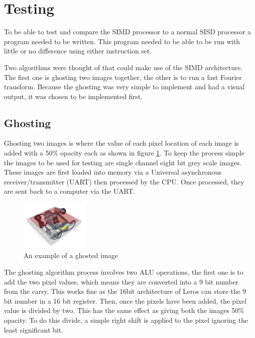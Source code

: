 \section{Testing}

To be able to test and compare the SIMD processor to a normal SISD processor a program
needed to be written. This program needed to be able to be run with little or no
difference using either instruction set.

Two algorithms were thought of that could make use of the SIMD architecture.
The first one is ghosting two images together, the other is to run a fast
Fourier transform. Because the ghosting was very simple to implement and had a
visual output, it was chosen to be implemented first.

\subsection{Ghosting}
  Ghosting two images is where the value of each pixel location of each image is
  added with a 50\% opacity each as shown in figure \ref{ghosting}. To keep the
  process simple the images to be used for testing are single channel eight bit
  grey scale images. These images are first loaded into memory via a Universal
  asynchronous receiver/transmitter (UART) then processed by the CPU.
  Once processed, they are sent back to a computer  via the UART.

  \begin{figure}[ht]
  \centering
  \includegraphics[width=0.3\textwidth]{images/ghosted}
  \caption{An example of a ghosted image}
  \label{ghosting}
  \end{figure}

  The ghosting algorithm process involves two ALU operations, the first one is
  to add the two pixel values, which means they are converted into a 9 bit
  number from the carry. This works fine as the 16bit architecture of Leros can
  store the 9 bit number in a 16 bit register. Then, once the pixels have been
  added, the pixel value is divided by two. This has the same effect as giving
  both the images 50\% opacity. To do this divide, a simple right shift is
  applied to the pixel ignoring the least significant bit.


